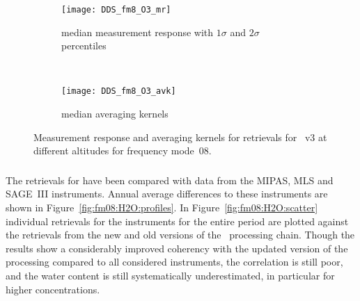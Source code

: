 \begin{figure}[htpb]
    \centering
    \begin{subfigure}[b]{0.49\textwidth}
        \texttt{[image: DDS\_fm8\_O3\_mr]}
        \caption{median measurement response with $1\sigma$ and $2\sigma$
        percentiles}
        \label{fig:fm08:O3:mr}
    \end{subfigure}
    \,
    \begin{subfigure}[b]{0.49\textwidth}
        \texttt{[image: DDS\_fm8\_O3\_avk]}
        \caption{median averaging kernels\newline~}
        \label{fig:fm08:O3:avk}
    \end{subfigure}
    \caption{Measurement response and averaging kernels for 
    retrievals for \smr~v3 at different altitudes for frequency mode~08.}
    \label{fig:fm08:O3:mr_avk}
\end{figure}



\subsubsection{}
\label{sec:fm08:comparison:H2O}
The retrievals for  have been compared with data from the MIPAS,
MLS and SAGE~III instruments. Annual average differences to these instruments
are shown in Figure~\ref{fig:fm08:H2O:profiles}. In
Figure~\ref{fig:fm08:H2O:scatter} individual retrievals for the instruments for
the entire period are plotted against the retrievals from the new and old
versions of the \smr\ processing chain. Though the results show a considerably
improved coherency with the updated version of the processing compared to all
considered instruments, the correlation is still poor, and the water content is
still systematically underestimated, in particular for higher concentrations.

